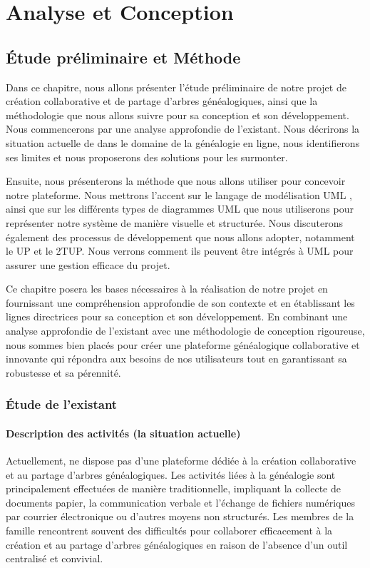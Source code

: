 \part{Analyse et Conception }
\label{part:analyse-et-conception}
\chapter{Étude préliminaire et Méthode}

Dans ce chapitre, nous allons présenter l’étude préliminaire de notre projet de
création collaborative et de partage d’arbres généalogiques, ainsi que la
méthodologie que nous allons suivre pour sa conception et son développement.
Nous commencerons par une analyse approfondie de l’existant. Nous décrirons la
situation actuelle de \firm dans le domaine de la généalogie en ligne, nous
identifierons ses limites et nous proposerons des solutions pour les surmonter.

Ensuite, nous présenterons la méthode que nous allons utiliser pour concevoir notre
plateforme. Nous mettrons l’accent sur le langage de modélisation \ac{UML} ,
ainsi que sur les différents types de diagrammes UML que nous utiliserons pour
représenter notre système de manière visuelle et structurée. Nous discuterons
également des processus de développement que nous allons adopter, notamment
le \ac{UP} et le \ac{2TUP}. Nous verrons comment ils peuvent être intégrés
à UML pour assurer une gestion efficace du projet.

Ce chapitre posera les bases nécessaires à la réalisation de notre projet en
fournissant une compréhension approfondie de son contexte et en établissant
les lignes directrices pour sa conception et son développement. En combinant
une analyse approfondie de l’existant avec une méthodologie de conception
rigoureuse, nous sommes bien placés pour créer une plateforme généalogique
collaborative et innovante qui répondra aux besoins de nos utilisateurs tout
en garantissant sa robustesse et sa pérennité.

\section{Étude de l'existant}
\subsection{Description des activités (la situation actuelle)}
Actuellement, \firm ne dispose pas d’une plateforme dédiée à la création
collaborative et au partage d’arbres généalogiques. Les activités liées à la
généalogie sont principalement effectuées de manière traditionnelle, impliquant
la collecte de documents papier, la communication verbale et l’échange de fichiers
numériques par courrier électronique ou d’autres moyens non structurés. Les
membres de la famille rencontrent souvent des difficultés pour collaborer
efficacement à la création et au partage d'arbres généalogiques en raison de
l'absence d'un outil centralisé et convivial.

